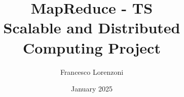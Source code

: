 


\lstset{language=JavaScript}

\title{MapReduce - TS\\Scalable and Distributed Computing Project}
\author{Francesco Lorenzoni}
\date{January 2025}



\maketitle



